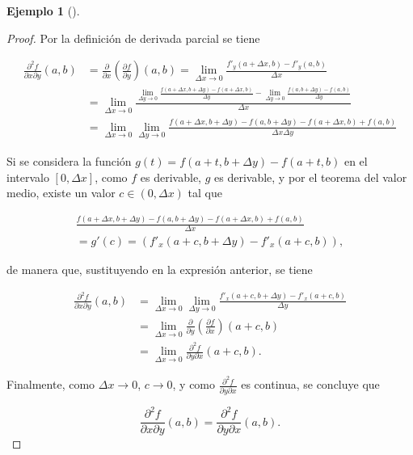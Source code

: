 \documentclass[
  a4paper,
]{scrreport}
\theoremstyle{definition}
\newtheorem{example}{Ejemplo}[chapter]
\theoremstyle{plain}
\theoremstyle{definition}
\theoremstyle{definition}
\theoremstyle{plain}
\theoremstyle{plain}
\theoremstyle{remark}
\begin{document}
\begin{example}[]
\begin{tcolorbox}
\begin{proof}
Por la definición de derivada parcial se tiene

\begin{align*}
\frac{\partial^2 f}{\partial x \partial y} (a,b)
&= \frac{\partial}{\partial x}\left(\frac{\partial f}{\partial y}\right)(a,b) 
= \lim_{\Delta x\to 0} \frac{f'_y(a+\Delta x,b)-f'_y(a,b)}{\Delta x} \\
&= \lim_{\Delta x\to 0} \frac{\lim_{\Delta y\to 0}\frac{f(a+\Delta x,b+\Delta y)-f(a+\Delta x,b)}{\Delta y} - \lim_{\Delta y\to 0}\frac{f(a,b+\Delta y)-f(a,b)}{\Delta y}}{\Delta x} \\
&= \lim_{\Delta x\to 0}\lim_{\Delta y\to 0} \frac{f(a+\Delta x, b+\Delta y)- f(a,b+\Delta y) -f(a+\Delta x, b) + f(a,b)}{\Delta x \Delta y}
\end{align*}

Si se considera la función \(g(t) = f(a+t, b+\Delta y)-f(a+t,b)\) en el
intervalo \([0,\Delta x]\), como \(f\) es derivable, \(g\) es derivable,
y por el teorema del valor medio, existe un valor \(c\in (0,\Delta x)\)
tal que

\[
\begin{gathered}
\frac{f(a+\Delta x, b+\Delta y)- f(a,b+\Delta y) -f(a+\Delta x, b) + f(a,b)}{\Delta x} \\
= g'(c)
= (f'_x(a+c, b+\Delta y) - f'_x(a+c,b)),
\end{gathered}
\]

de manera que, sustituyendo en la expresión anterior, se tiene

\begin{align*}
\frac{\partial^2 f}{\partial x \partial y} (a,b)
&= \lim_{\Delta x\to 0}\lim_{\Delta y\to 0} \frac{f'_x(a+c, b+\Delta y) - f'_x(a+c,b)}{\Delta y} \\
&= \lim_{\Delta x\to 0}\frac{\partial}{\partial y}\left(\frac{\partial f}{\partial x}\right)(a+c, b) \\
&= \lim_{\Delta x\to 0}\frac{\partial^2 f}{\partial y\partial x}(a+c, b).
\end{align*}

Finalmente, como \(\Delta x \to 0\), \(c\to 0\), y como
\(\frac{\partial^2 f}{\partial y\partial x}\) es continua, se concluye
que

\[
\frac{\partial^2 f}{\partial x \partial y} (a,b) = \frac{\partial^2 f}{\partial y \partial x} (a,b).
\]
\end{proof}

\end{tcolorbox}


\end{example}
\end{document}
